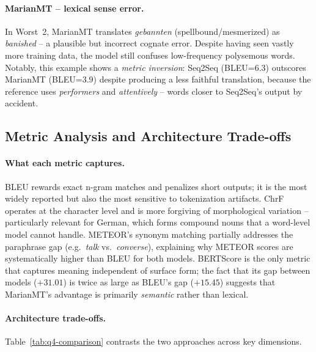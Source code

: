 \documentclass[11pt,a4paper]{article}
\begin{document}
\paragraph{MarianMT -- lexical sense error.}
In Worst~2, MarianMT translates \emph{gebannten} (spellbound/mesmerized) as
\emph{banished} -- a plausible but incorrect cognate error. Despite having
seen vastly more training data, the model still confuses low-frequency
polysemous words. Notably, this example shows a \emph{metric inversion}:
Seq2Seq (BLEU=6.3) outscores MarianMT (BLEU=3.9) despite producing a less
faithful translation, because the reference uses \emph{performers} and
\emph{attentively} -- words closer to Seq2Seq's output by accident.

\subsection{Metric Analysis and Architecture Trade-offs}

\paragraph{What each metric captures.}
BLEU rewards exact n-gram matches and penalizes short outputs; it is the most
widely reported but also the most sensitive to tokenization artifacts. ChrF
operates at the character level and is more forgiving of morphological
variation -- particularly relevant for German, which forms compound nouns that
a word-level model cannot handle. METEOR's synonym matching partially addresses
the paraphrase gap (e.g.\ \emph{talk} vs.\ \emph{converse}), explaining why
METEOR scores are systematically higher than BLEU for both models. BERTScore
is the only metric that captures meaning independent of surface form; the fact
that its gap between models ($+31.01$) is twice as large as BLEU's gap
($+15.45$) suggests that MarianMT's advantage is primarily \emph{semantic}
rather than lexical.

\paragraph{Architecture trade-offs.}
Table~\ref{tab:q4-comparison} contrasts the two approaches across key
dimensions.
\end{document}
